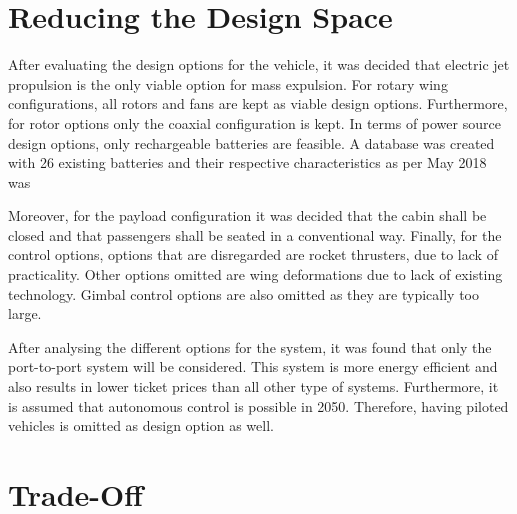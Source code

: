 \section{Reducing the Design Space}
After evaluating the design options for the vehicle, it was decided that electric jet propulsion is the only viable option for mass expulsion. For rotary wing configurations, all rotors and fans are kept as viable design options. Furthermore, for rotor options only the coaxial configuration is kept. In terms of power source design options, only rechargeable batteries are feasible. A database was created with 26 existing batteries and their respective characteristics as per May 2018 was 

Moreover, for the payload configuration it was decided that the cabin shall be closed and that passengers shall be seated in a conventional way. Finally, for the control options, options that are disregarded are rocket thrusters, due to lack of practicality. Other options omitted are wing deformations due to lack of existing technology. Gimbal control options are also omitted as they are typically too large. 

After analysing the different options for the system, it was found that only the port-to-port system will be considered. This system is more energy efficient and also results in lower ticket prices than all other type of systems. Furthermore, it is assumed that autonomous control is possible in 2050. Therefore, having piloted vehicles is omitted as design option as well.





\section{Trade-Off}










